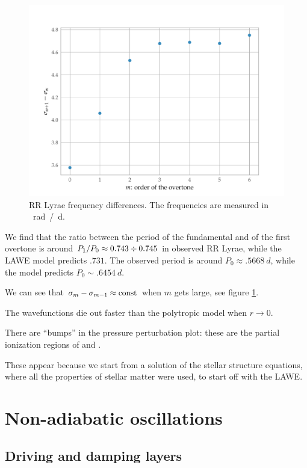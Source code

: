 \documentclass[main.tex]{subfiles}
\begin{document}
\begin{figure}[ht]
\centering
\includegraphics[width=\textwidth]{figures/RR_Lyr_frequency_differences.pdf}
\caption{RR Lyrae frequency differences. The frequencies are measured in \SI{}{rad / d}.}
\label{fig:RR_Lyr_frequency_differences}
\end{figure}

We find that the ratio between the period of the fundamental and of the first overtone is around \(P_1 / P_0 \approx \num{.743} \divisionsymbol \num{.745}\) in observed RR Lyrae, while the LAWE model predicts \(\num{.731}\). 
The observed period is around \(P_0 \approx \SI{.5668}{d}\), while the model predicts \(P_0 \sim \SI{.6454}{d}\). 

We can see that \(\sigma_m - \sigma_{m-1} \approx \text{const}\) when \(m\) gets large, see figure \ref{fig:RR_Lyr_frequency_differences}.
  

The wavefunctions die out faster than the polytropic model when \(r \rightarrow 0\).

There are ``bumps'' in the pressure perturbation plot: these are the partial ionization regions of  and .

These appear because we start from a solution of the stellar structure equations, where all the properties of stellar matter were used, to start off with the LAWE.

\section{Non-adiabatic oscillations}

\subsection{Driving and damping layers}
\end{document}
